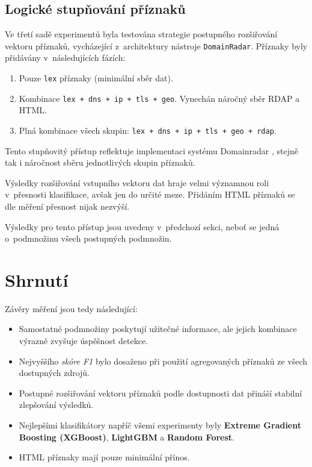 \subsection{Logické stupňování příznaků}
\label{logi_step}

Ve třetí sadě experimentů byla testována strategie postupného rozšiřování vektoru příznaků, vycházející z~architektury nástroje \texttt{DomainRadar}. Příznaky byly přidávány v~následujících fázích:

\begin{enumerate}
    \item Pouze \texttt{lex} příznaky (minimální sběr dat).
    \item Kombinace \texttt{lex + dns + ip + tls + geo}. Vynechán náročný sběr RDAP a HTML. 
    \item Plná kombinace všech skupin: \texttt{lex + dns + ip + tls + geo + rdap}.
\end{enumerate}

Tento stupňovitý přístup reflektuje implementaci systému Domainradar \cite{domainradar}, stejně tak i náročnost sběru jednotlivých skupin příznaků. 

Výsledky rozšiřování vstupního vektoru dat hraje velmi významnou roli v~přesnosti klasifikace, avšak jen do určité meze. Přidáním HTML příznaků se dle měření přesnost nijak nezvýší. 

Výsledky pro tento přístup jsou uvedeny v~předchozí sekci, neboť se  jedná o~podmnožinu všech postupných podmnožin. 


\clearpage

\section{Shrnutí}
Závěry měření jsou tedy následující:

\begin{itemize}
    \item Samostatné podmnožiny poskytují užitečné informace, ale jejich kombinace výrazně zvyšuje úspěšnost detekce.
    \item Nejvyššího \textit{skóre F1} bylo dosaženo při použití agregovaných příznaků ze všech dostupných zdrojů.
    \item Postupné rozšiřování vektoru příznaků podle dostupnosti dat přináší stabilní zlepšování výsledků.
    \item Nejlepšími klasifikátory napříč všemi experimenty byly \textbf{Extreme Gradient Boosting (XGBoost)}, \textbf{LightGBM} a \textbf{Random Forest}.
    \item HTML příznaky mají pouze minimální přínos. 
\end{itemize}



